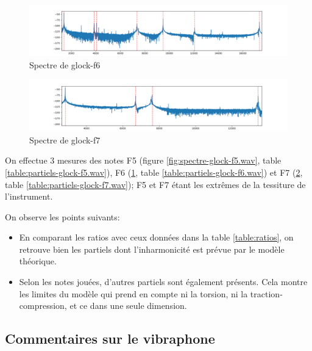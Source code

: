 \documentclass[atiam, article]{rapport} %
\begin{document}
\begin{figure}
  \begin{center}
      \includegraphics[width=\textwidth]{percu/glock-f6.wav.spectre.png}
  \end{center}
  \caption{Spectre de glock-f6}
  \label{fig:spectre-glock-f6.wav}
\end{figure}


\begin{figure}
  \begin{center}
      \includegraphics[width=\textwidth]{percu/glock-f7.wav.spectre.png}
  \end{center}
  \caption{Spectre de glock-f7}
  \label{fig:spectre-glock-f7.wav}
\end{figure}


On effectue 3 mesures des notes F5 (figure \ref{fig:spectre-glock-f5.wav}, table \ref{table:partiels-glock-f5.wav}), F6 (\ref{fig:spectre-glock-f6.wav}, table \ref{table:partiels-glock-f6.wav}) et F7 (\ref{fig:spectre-glock-f7.wav}, table \ref{table:partiels-glock-f7.wav}); F5 et F7 étant les extrêmes de la tessiture de l'instrument.

On observe les points suivants:
\begin{itemize}
  \item En comparant les ratios avec ceux données dans la table \ref{table:ratios}, on retrouve bien les partiels dont l'inharmonicité est prévue par le modèle théorique.
  \item Selon les notes jouées, d'autres partiels sont également présents. Cela montre les limites du modèle qui prend en compte ni la torsion, ni la traction-compression, et ce dans une seule dimension.
\end{itemize}

\subsection{Commentaires sur le vibraphone}
\end{document}
